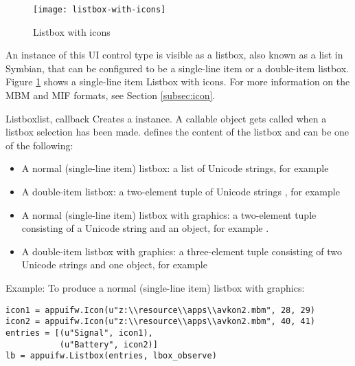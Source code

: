 \begin{figure}[htbp]
\centering
\texttt{[image: listbox-with-icons]}
\caption{Listbox with icons}
\label{fig:listbox-with-icons}
\end{figure}

An instance of this UI control type is visible as a listbox, also known as a 
list in Symbian, that can be configured to be a single-line item or a 
double-item listbox. Figure \ref{fig:listbox-with-icons} shows a single-line 
item Listbox with icons. For more information on the MBM and MIF formats, 
see Section \ref{subsec:icon}.

\begin{classdesc}{Listbox}{list, callback}
Creates a  instance. A callable object 
 gets called when a listbox selection has been 
made.  defines the content of the listbox and can be one of the 
following:

\begin{itemize}
\item A normal (single-line item) listbox: a list of Unicode strings, for example 
\item A double-item listbox: a two-element tuple of Unicode strings , for example 
\item A normal (single-line item) listbox with graphics: a two-element tuple consisting of a Unicode string and an  object, for example .
\item A double-item listbox with graphics: a three-element tuple consisting of two Unicode strings and one  object, for example 
\end{itemize}

Example: To produce a normal (single-line item) listbox with graphics:
\begin{verbatim}
icon1 = appuifw.Icon(u"z:\\resource\\apps\\avkon2.mbm", 28, 29)
icon2 = appuifw.Icon(u"z:\\resource\\apps\\avkon2.mbm", 40, 41)
entries = [(u"Signal", icon1),
           (u"Battery", icon2)]
lb = appuifw.Listbox(entries, lbox_observe)
\end{verbatim}
\end{classdesc}


